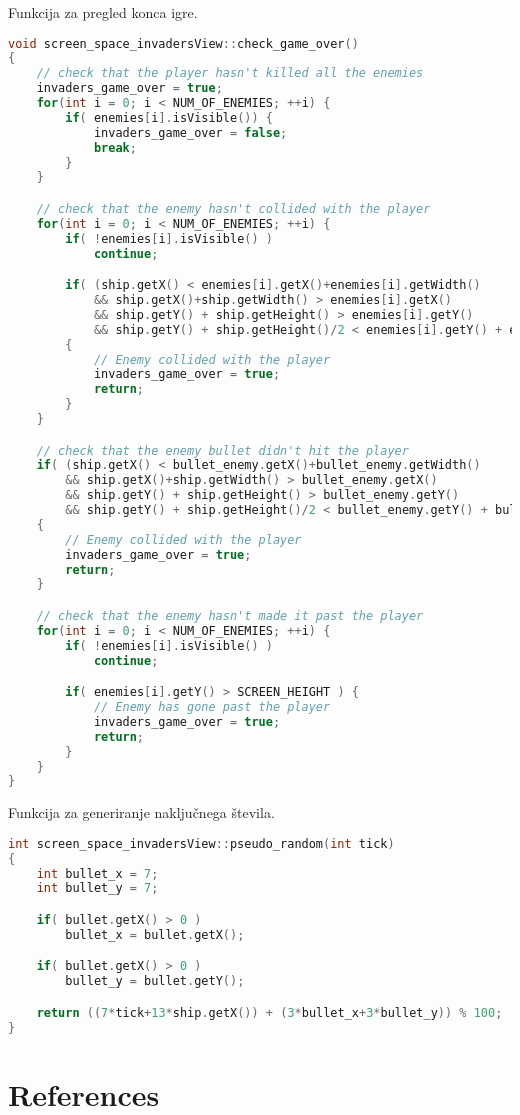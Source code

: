 \documentclass{article}
\begin{document}
\noindent
Funkcija za pregled konca igre.
\begin{lstlisting}[language=c++]
void screen_space_invadersView::check_game_over()
{
	// check that the player hasn't killed all the enemies
	invaders_game_over = true;
	for(int i = 0; i < NUM_OF_ENEMIES; ++i) {
		if( enemies[i].isVisible()) {
			invaders_game_over = false;
			break;
		}
	}

	// check that the enemy hasn't collided with the player
	for(int i = 0; i < NUM_OF_ENEMIES; ++i) {
		if( !enemies[i].isVisible() )
			continue;

		if( (ship.getX() < enemies[i].getX()+enemies[i].getWidth()
			&& ship.getX()+ship.getWidth() > enemies[i].getX()
			&& ship.getY() + ship.getHeight() > enemies[i].getY()
			&& ship.getY() + ship.getHeight()/2 < enemies[i].getY() + enemies[i].getHeight()))
		{
			// Enemy collided with the player
			invaders_game_over = true;
			return;
		}
	}

	// check that the enemy bullet didn't hit the player
	if( (ship.getX() < bullet_enemy.getX()+bullet_enemy.getWidth()
		&& ship.getX()+ship.getWidth() > bullet_enemy.getX()
		&& ship.getY() + ship.getHeight() > bullet_enemy.getY()
		&& ship.getY() + ship.getHeight()/2 < bullet_enemy.getY() + bullet_enemy.getHeight()))
	{
		// Enemy collided with the player
		invaders_game_over = true;
		return;
	}

	// check that the enemy hasn't made it past the player
	for(int i = 0; i < NUM_OF_ENEMIES; ++i) {
		if( !enemies[i].isVisible() )
			continue;

		if( enemies[i].getY() > SCREEN_HEIGHT ) {
			// Enemy has gone past the player
			invaders_game_over = true;
			return;
		}
	}
}
\end{lstlisting}

\noindent
Funkcija za generiranje naklju\v{c}nega \v{s}tevila.
\begin{lstlisting}[language=c++]
int screen_space_invadersView::pseudo_random(int tick)
{
	int bullet_x = 7;
	int bullet_y = 7;

	if( bullet.getX() > 0 )
		bullet_x = bullet.getX();

	if( bullet.getX() > 0 )
		bullet_y = bullet.getY();

	return ((7*tick+13*ship.getX()) + (3*bullet_x+3*bullet_y)) % 100;
}
\end{lstlisting}

\clearpage
\section{References}
\noindent

\printbibliography
\end{document}
